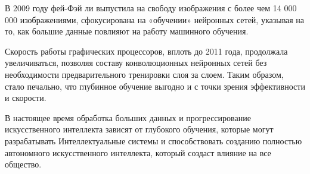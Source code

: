 В 2009 году фей-Фэй ли выпустила на свободу изображения
с более чем 14 000 000 изображениями,
сфокусирована на «обучении» нейронных сетей, указывая на то,
как большие данные повлияют на работу машинного обучения.

Скорость работы графических процессоров, вплоть до 2011 года,
продолжала увеличиваться, позволяя составу конволюционных нейронных
сетей без необходимости предварительного тренировки слоя за слоем.
Таким образом, стало печально, что глубинное обучение выгодно и
с точки зрения эффективности и скорости.

В настоящее время обработка больших данных и прогрессирование искусственного интеллекта зависят от глубокого обучения,
которые могут разрабатывать Интеллектуальные системы и способствовать созданию полностью автономного искусственного интеллекта,
который создаст влияние на все общество.